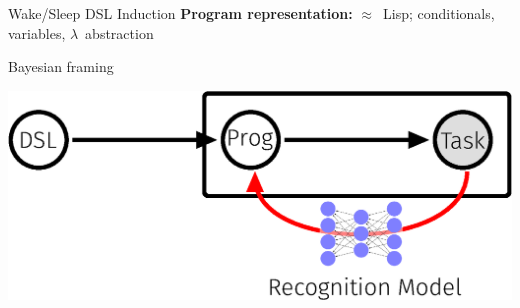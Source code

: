 \documentclass[final]{beamer}
\newlength{\onecolwid}
\begin{document}
\begin{frame}[t]
\begin{columns}[t]
\begin{column}{\onecolwid}
\begin{alertblock}{Wake/Sleep DSL Induction}
  \textbf{Program representation:}
  $\approx $~Lisp; conditionals, variables, $\lambda$~abstraction

\end{alertblock}


\begin{block}{Bayesian framing}

    \includegraphics[width = 20cm]{figures/animation/DC.eps}







\end{block}
\end{column}
\end{columns}
\end{frame}
\end{document}
